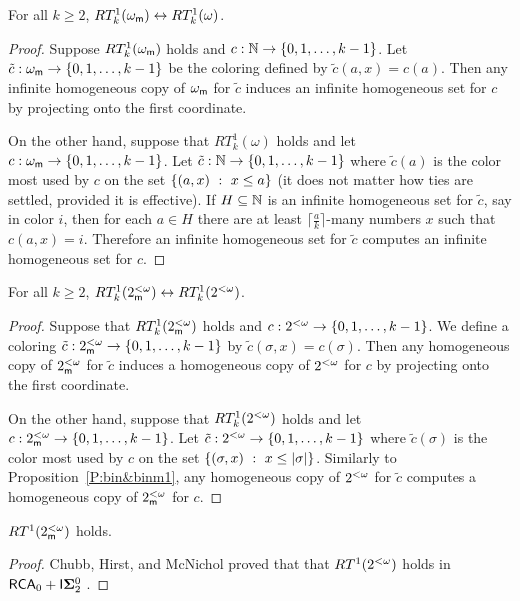 \begin{prop}[\RCAo]\label{P:bin&binm1}
For all $k\geq 2$, $RT^1_k(\omega_\mathsf{m})\leftrightarrow RT^1_k(\omega)$.
\end{prop}
\begin{proof}
Suppose $RT^1_k(\omega_\mathsf{m})$ holds and $c:\mathbb{N}\to\{0,1,\ldots,k-1\}$.
Let $\tilde{c}:\omega_\mathsf{m}\to\{0,1,\ldots,k-1\}$ be the coloring
defined by $\tilde{c}(a,x)=c(a)$.
Then any infinite homogeneous copy of $\omega_\mathsf{m}$ for $\tilde{c}$ induces an
infinite homogeneous set for $c$ by projecting onto the first coordinate.

On the other hand, suppose that $RT^1_k(\omega)$ holds and
let $c:\omega_\mathsf{m}\to\{0,1,\ldots,k-1\}$.
Let $\tilde{c}:\mathbb{N}\to\{0,1,\ldots,k-1\}$ where
$\tilde{c}(a)$ is the color most used by $c$
on the set $\left\{(a,x)\ :\ x\leq a\right\}$
(it does not matter how ties are settled, provided it is effective).
If $H\subseteq\mathbb{N}$ is an infinite homogeneous set for $\tilde{c}$,
say in color $i$, then for each $a\in H$ there are at least
$\lceil \frac{a}{k}\rceil$-many numbers $x$ such that $c(a,x)=i$.
Therefore an infinite homogeneous set for $\tilde{c}$ computes
an infinite homogeneous set for $c$.
\end{proof}


\begin{prop}[\RCAo]
For all $k\geq 2$, $RT^1_k(2^{<\omega}_{\mathsf{m}})\leftrightarrow RT^1_k(2^{<\omega})$.
\end{prop}
\begin{proof}
Suppose that $RT^1_k(2^{<\omega}_{\mathsf{m}})$ holds and $c:2^{<\omega}\to\{0,1,\ldots,k-1\}$.
We define a coloring $\tilde{c}:2^{<\omega}_{\mathsf{m}}\to\{0,1,\ldots,k-1\}$
by $\tilde{c}(\sigma,x)=c(\sigma)$.
Then any homogeneous copy of $2^{<\omega}_{\mathsf{m}}$ for $\tilde{c}$ induces a homogeneous
copy of $2^{<\omega}$ for $c$ by projecting onto the first coordinate.

On the other hand, suppose that $RT^1_k(2^{<\omega})$ holds and
let $c:2^{<\omega}_{\mathsf{m}}\to\{0,1,\ldots,k-1\}$.
Let $\tilde{c}:2^{<\omega}\to\{0,1,\ldots,k-1\}$ where
$\tilde{c}(\sigma)$ is the color most used by $c$
on the set $\left\{(\sigma,x)\ :\ x\leq |\sigma|\right\}$.
Similarly to Proposition~\ref{P:bin&binm1},
any homogeneous copy of $2^{<\omega}$ for $\tilde{c}$ computes
a homogeneous copy of $2^{<\omega}_{\mathsf{m}}$ for $c$.
\end{proof}

\begin{cor}
$RT^1(2^{<\omega}_{\mathsf{m}})$ holds.
\end{cor}
\begin{proof}
Chubb, Hirst, and McNichol proved that that $RT^1(2^{<\omega})$
holds in $\mathsf{RCA}_0+\mathsf{I}{\mathbf{\Sigma}^0_2}$ \cite{CHM}.
\end{proof}

